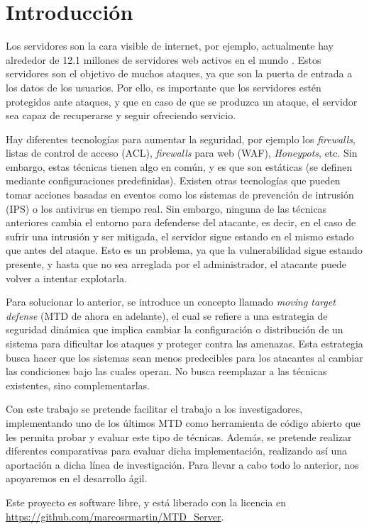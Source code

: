 \chapter{Introducción}

Los servidores son la cara visible de internet, por ejemplo, actualmente hay alrededor de 12.1 millones de servidores web activos en el mundo \cite{netcraft-agosto23}. Estos servidores son el objetivo de muchos ataques, ya que son la puerta de entrada a los datos de los usuarios.\cite{breaches-2023} Por ello, es importante que los servidores estén protegidos ante ataques, y que en caso de que se produzca un ataque, el servidor sea capaz de recuperarse y seguir ofreciendo servicio.

Hay diferentes tecnologías para aumentar la seguridad, por ejemplo los \textit{firewalls}, listas de control de acceso (ACL), \textit{firewalls} para web (WAF), \textit{Honeypots}, etc. Sin embargo, estas técnicas tienen algo en común, y es que son estáticas (se definen mediante configuraciones predefinidas). Existen otras tecnologías que pueden tomar acciones basadas en eventos como los sistemas de prevención de intrusión (IPS) o los antivirus en tiempo real. Sin embargo, ninguna de las técnicas anteriores cambia el entorno para defenderse del atacante, es decir, en el caso de sufrir una intrusión y ser mitigada, el servidor sigue estando en el mismo estado que antes del ataque. Esto es un problema, ya que la vulnerabilidad sigue estando presente, y hasta que no sea arreglada por el administrador, el atacante puede volver a intentar explotarla.

Para solucionar lo anterior, se introduce un concepto llamado \textit{moving target defense}\cite{big-state-of-art} (MTD de ahora en adelante), el cual se refiere a una estrategia de seguridad dinámica que implica cambiar la configuración o distribución de un sistema para dificultar los ataques y proteger contra las amenazas. Esta estrategia busca hacer que los sistemas sean menos predecibles para los atacantes al cambiar las condiciones bajo las cuales operan. No busca reemplazar a las técnicas existentes, sino complementarlas.

Con este trabajo se pretende facilitar el trabajo a los investigadores, implementando uno de los últimos MTD como herramienta de código abierto que les permita probar y evaluar este tipo de técnicas. Además, se pretende realizar diferentes comparativas para evaluar dicha implementación, realizando así una aportación a dicha línea de investigación. Para llevar a cabo todo lo anterior, nos apoyaremos en el desarrollo ágil.

Este proyecto es software libre, y está liberado con la licencia\cite{gplv3} en \url{https://github.com/marcosrmartin/MTD_Server}.